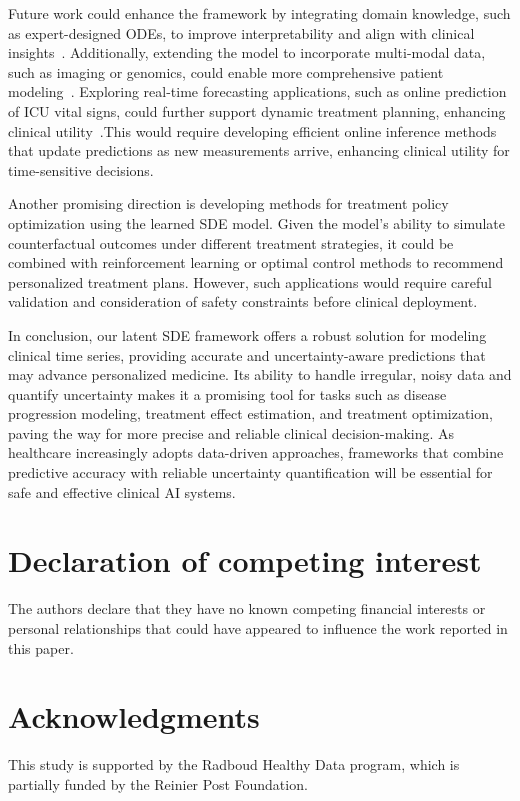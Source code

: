\documentclass[preprint,12pt]{elsarticle}
\begin{document}
Future work could enhance the framework by integrating domain knowledge, such as expert-designed ODEs, to improve interpretability and align with clinical insights~\citep{qian2021integrating}. Additionally, extending the model to incorporate multi-modal data, such as imaging or genomics, could enable more comprehensive patient modeling~\citep{bazgir2023integration, vanguri2022multimodal}. Exploring real-time forecasting applications, such as online prediction of ICU vital signs, could further support dynamic treatment planning, enhancing clinical utility~\citep{zhang2025intelligent, lim2024real}.This would require developing efficient online inference methods that update predictions as new measurements arrive, enhancing clinical utility for time-sensitive decisions.

Another promising direction is developing methods for treatment policy optimization using the learned SDE model. Given the model's ability to simulate counterfactual outcomes under different treatment strategies, it could be combined with reinforcement learning or optimal control methods to recommend personalized treatment plans. However, such applications would require careful validation and consideration of safety constraints before clinical deployment.

In conclusion, our latent SDE framework offers a robust solution for modeling clinical time series, providing accurate and uncertainty-aware predictions that may advance personalized medicine. Its ability to handle irregular, noisy data and quantify uncertainty makes it a promising tool for tasks such as disease progression modeling, treatment effect estimation, and treatment optimization, paving the way for more precise and reliable clinical decision-making. As healthcare increasingly adopts data-driven approaches, frameworks that combine predictive accuracy with reliable uncertainty quantification will be essential for safe and effective clinical AI systems.



\section*{Declaration of competing interest}
The authors declare that they have no known competing financial interests or personal relationships that could have appeared to influence the work reported in this paper.
\section*{Acknowledgments}
This study is supported by the Radboud Healthy Data program, which is partially funded by the Reinier Post Foundation.
\end{document}
